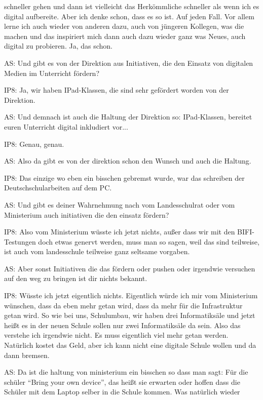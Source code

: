 \documentclass[fontsize=11pt,paper=a4]{scrbook}
\begin{document}
{\begin{itemize*}
		schneller gehen und dann ist vielleicht das Herkömmliche schneller als wenn ich es digital aufbereite. Aber ich denke schon, dass es so ist. Auf jeden Fall.
		Vor allem lerne ich auch
		wieder von anderen dazu, auch von jüngeren Kollegen, was die machen und das inspiriert mich dann auch dazu wieder ganz was Neues, auch digital zu probieren. Ja, das schon.
		\item[AS:] Und gibt es von der
		Direktion aus Initiativen, die den
		Einsatz von digitalen Medien im Unterricht
		fördern?
		\item[IP8:] Ja, wir haben IPad-Klassen, die sind sehr gefördert worden von der Direktion.
		\item[AS:] Und demnach ist auch die Haltung der Direktion so: IPad-Klassen, bereitet euren Unterricht
		digital inkludiert vor...
		\item[IP8:] Genau, genau.
		\item[AS:] Also da gibt
		es von der direktion schon den Wunsch und auch die Haltung.
		\item[IP8:] Das einzige wo eben ein bisschen gebremst wurde, war das schreiben der Deutschschularbeiten auf dem PC.
		\item[AS:] Und gibt es deiner Wahrnehmung nach vom Landesschulrat oder vom
		Ministerium auch initiativen die den
		einsatz fördern?
		\item[IP8:] Also vom Ministerium wüsste ich jetzt nichts, außer dass wir mit den BIFI-Testungen doch etwas genervt werden, muss man so sagen, weil das sind teilweise, ist auch vom landesschule teilweise ganz seltsame
		vorgaben.
		\item[AS:] Aber sonst Initiativen die das fördern
		oder pushen oder irgendwie versuchen auf
		den weg zu bringen ist dir nichts bekannt.
		\item[IP8:] Wüsste ich jetzt eigentlich nichts. Eigentlich würde ich mir vom Ministerium wünschen, dass da eben mehr getan wird, dass da mehr für die Infrastruktur getan wird. So wie bei uns, Schulumbau, wir haben drei Informatiksäle und jetzt heißt es in der neuen Schule sollen nur zwei Informatiksäle da sein. Also das verstehe ich irgendwie nicht. Es muss eigentlich viel mehr getan werden. Natürlich kostet das Geld, aber ich kann nicht eine digitale Schule wollen und da dann bremsen.
		\item[AS:] Da ist die
		haltung von ministerium ein bisschen so
		dass man sagt: Für die schüler "`Bring your own device"', das heißt sie erwarten
		oder hoffen dass die Schüler mit dem Laptop selber in die Schule
		kommen. Was natürlich wieder

\end{itemize*}}
\end{document}
